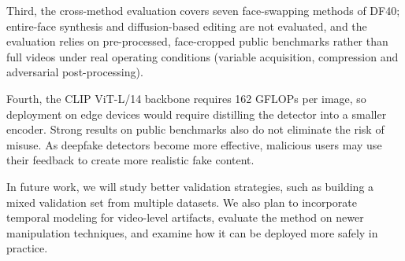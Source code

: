 \documentclass[fonts]{icst}
\newif\ifrevmark\revmarkfalse
\newcommand{\rev}[1]{\ifrevmark{\color{revblue}#1}\else#1\fi}
\begin{document}
\rev{Third, the cross-method evaluation covers seven face-swapping methods of DF40; entire-face synthesis and diffusion-based editing are not evaluated, and the evaluation relies on pre-processed, face-cropped public benchmarks rather than full videos under real operating conditions (variable acquisition, compression and adversarial post-processing).}

\rev{Fourth, the CLIP ViT-L/14 backbone requires 162 GFLOPs per image, so deployment on edge devices would require distilling the detector into a smaller encoder.} Strong results on public benchmarks also do not eliminate the risk of misuse. As deepfake detectors become more effective, malicious users may use their feedback to create more realistic fake content.

In future work, we will study better validation strategies, such as building a mixed validation set from multiple datasets. We also plan to incorporate temporal modeling for video-level artifacts, evaluate the method on newer manipulation techniques, and examine how it can be deployed more safely in practice.
\end{document}
